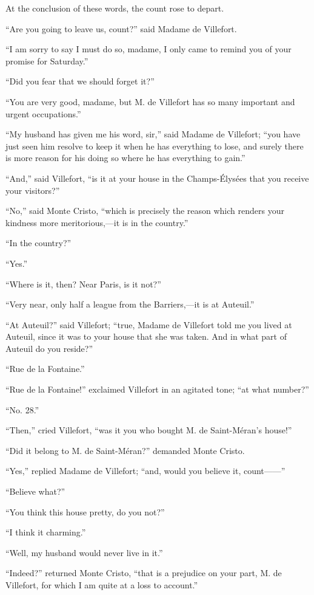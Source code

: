 At the conclusion of these words, the count rose to depart.

“Are you going to leave us, count?” said Madame de Villefort.

“I am sorry to say I must do so, madame, I only came to remind you of
your promise for Saturday.”

“Did you fear that we should forget it?”

“You are very good, madame, but M. de Villefort has so many important
and urgent occupations.”

“My husband has given me his word, sir,” said Madame de Villefort; “you
have just seen him resolve to keep it when he has everything to lose,
and surely there is more reason for his doing so where he has
everything to gain.”

“And,” said Villefort, “is it at your house in the Champs-Élysées that
you receive your visitors?”

“No,” said Monte Cristo, “which is precisely the reason which renders
your kindness more meritorious,—it is in the country.”

“In the country?”

“Yes.”

“Where is it, then? Near Paris, is it not?”

“Very near, only half a league from the Barriers,—it is at Auteuil.”

“At Auteuil?” said Villefort; “true, Madame de Villefort told me you
lived at Auteuil, since it was to your house that she was taken. And in
what part of Auteuil do you reside?”

“Rue de la Fontaine.”

“Rue de la Fontaine!” exclaimed Villefort in an agitated tone; “at what
number?”

“No. 28.”

“Then,” cried Villefort, “was it you who bought M. de Saint-Méran’s
house!”

“Did it belong to M. de Saint-Méran?” demanded Monte Cristo.

“Yes,” replied Madame de Villefort; “and, would you believe it,
count——”

“Believe what?”

“You think this house pretty, do you not?”

“I think it charming.”

“Well, my husband would never live in it.”

“Indeed?” returned Monte Cristo, “that is a prejudice on your part, M.
de Villefort, for which I am quite at a loss to account.”

